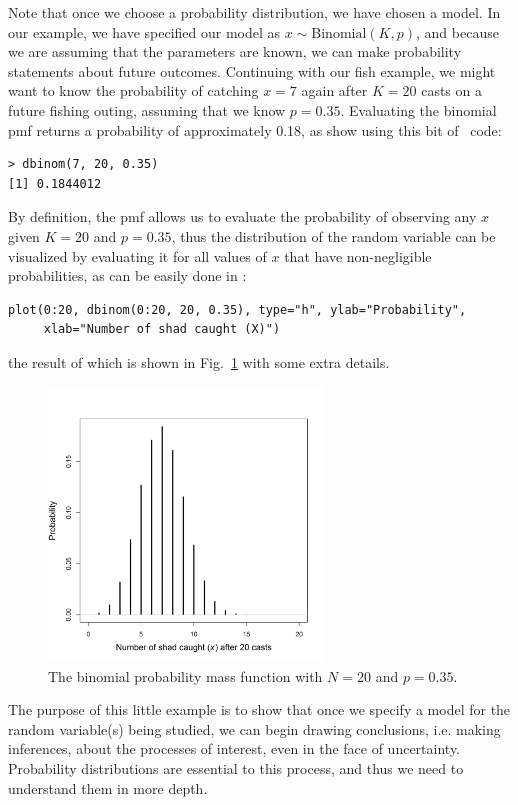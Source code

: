 Note that once we choose a probability distribution, we have chosen a
model. In our example, we have specified our model as $x \sim
\text{Binomial}(K,p)$, and because we are assuming that the parameters are
known, we can make probability statements about future
outcomes. Continuing with our fish example, we might want to know
the probability of catching $x=7$ again after $K=20$ casts on a future fishing outing,
assuming that we know $p=0.35$. Evaluating the binomial pmf returns a
probability of approximately 0.18, as show using this bit of \R~code:
\begin{verbatim}
> dbinom(7, 20, 0.35)
[1] 0.1844012
\end{verbatim}
By definition, the pmf allows us to evaluate the probability of observing
any $x$ given $K=20$ and $p=0.35$, thus the distribution of the random variable
can be visualized by evaluating it for all values of $x$ that have
non-negligible probabilities, as can be easily done in \R:
\begin{verbatim}
plot(0:20, dbinom(0:20, 20, 0.35), type="h", ylab="Probability",
     xlab="Number of shad caught (X)")
\end{verbatim}
the result of which is shown in Fig.~\ref{modeling.fig.bin} with some extra details.
\begin{figure}%
  \centering
  \includegraphics[width=0.65\textwidth]{Ch2/figs/bin}
\caption{The binomial probability mass function with $N=20$ and
  $p=0.35$. }
\label{modeling.fig.bin}
\end{figure}

The purpose of this little example is to show that once we specify a
model for the random variable(s) being studied, we can begin drawing
conclusions, i.e. making inferences, about the processes of interest,
even in the face of uncertainty. Probability distributions are
essential to this process, and thus we need to
understand them in more depth.


